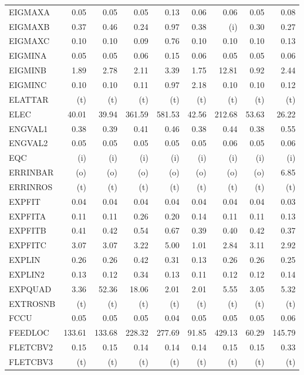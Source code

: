 \documentclass[11pt,twoside]{article}
\begin{document}
{\begin{longtable}[c]{|l|r|r|r|r|r|r|r|r|}
EIGMAXA & 0.05 & 0.05 & 0.05 & 0.13 & 0.06 & 0.06 & 0.05 & 0.08 \\
EIGMAXB & 0.37 & 0.46 & 0.24 & 0.97 & 0.38 & (i) & 0.30 & 0.27 \\
EIGMAXC & 0.10 & 0.10 & 0.09 & 0.76 & 0.10 & 0.10 & 0.10 & 0.13 \\
EIGMINA & 0.05 & 0.05 & 0.06 & 0.15 & 0.06 & 0.05 & 0.05 & 0.06 \\
EIGMINB & 1.89 & 2.78 & 2.11 & 3.39 & 1.75 & 12.81 & 0.92 & 2.44 \\
EIGMINC & 0.10 & 0.10 & 0.11 & 0.97 & 2.18 & 0.10 & 0.10 & 0.12 \\
ELATTAR & (t) & (t) & (t) & (t) & (t) & (t) & (t) & (t) \\
ELEC & 40.01 & 39.94 & 361.59 & 581.53 & 42.56 & 212.68 & 53.63 & 26.22 \\
ENGVAL1 & 0.38 & 0.39 & 0.41 & 0.46 & 0.38 & 0.44 & 0.38 & 0.55 \\
ENGVAL2 & 0.05 & 0.05 & 0.05 & 0.05 & 0.05 & 0.06 & 0.05 & 0.06 \\
EQC & (i) & (i) & (i) & (i) & (i) & (i) & (i) & (i) \\
ERRINBAR & (o) & (o) & (o) & (o) & (o) & (o) & (o) & 6.85 \\
ERRINROS & (t) & (t) & (t) & (t) & (t) & (t) & (t) & (t) \\
EXPFIT & 0.04 & 0.04 & 0.04 & 0.04 & 0.04 & 0.04 & 0.04 & 0.03 \\
EXPFITA & 0.11 & 0.11 & 0.26 & 0.20 & 0.14 & 0.11 & 0.11 & 0.13 \\
EXPFITB & 0.41 & 0.42 & 0.54 & 0.67 & 0.39 & 0.40 & 0.42 & 0.37 \\
EXPFITC & 3.07 & 3.07 & 3.22 & 5.00 & 1.01 & 2.84 & 3.11 & 2.92 \\
EXPLIN & 0.26 & 0.26 & 0.42 & 0.31 & 0.13 & 0.26 & 0.26 & 0.25 \\
EXPLIN2 & 0.13 & 0.12 & 0.34 & 0.13 & 0.11 & 0.12 & 0.12 & 0.14 \\
EXPQUAD & 3.36 & 52.36 & 18.06 & 2.01 & 2.01 & 5.55 & 3.05 & 5.32 \\
EXTROSNB & (t) & (t) & (t) & (t) & (t) & (t) & (t) & (t) \\
FCCU & 0.05 & 0.05 & 0.05 & 0.04 & 0.05 & 0.05 & 0.05 & 0.06 \\
FEEDLOC & 133.61 & 133.68 & 228.32 & 277.69 & 91.85 & 429.13 & 60.29 & 145.79 \\
FLETCBV2 & 0.15 & 0.15 & 0.14 & 0.14 & 0.14 & 0.15 & 0.15 & 0.33 \\
FLETCBV3 & (t) & (t) & (t) & (t) & (t) & (t) & (t) & (t) \\

\end{longtable}}
\end{document}
